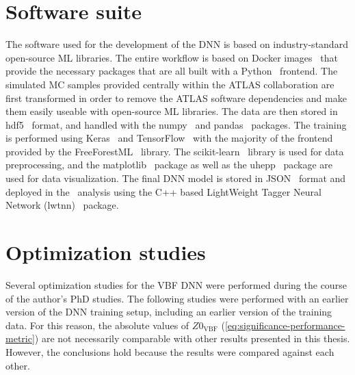 \section{Software suite}
\label{app:dnn:software-suite}
The software used for the development of the DNN is based on industry-standard open-source ML libraries.
The entire workflow is based on Docker images~\cite{merkel2014docker} that provide the necessary packages that are all built with a Python~\cite{10.5555/1593511} frontend. The simulated MC samples provided centrally within the ATLAS collaboration are first transformed in order to remove the ATLAS software dependencies and make them easily useable with open-source ML libraries. The data are then stored in hdf5~\cite{fortner1998hdf} format, and handled with the numpy~\cite{2020NumPy-Array} and pandas~\cite{mckinney2010data} packages. The training is performed using Keras~\cite{chollet2015keras} and TensorFlow~\cite{abadi2016tensorflow} with the majority of the frontend provided by the FreeForestML~\cite{FreeForestML} library.
The scikit-learn~\cite{pedregosa2011scikit} library is used for data preprocessing, and the matplotlib~\cite{hunter2007matplotlib} package as well as the uhepp~\cite{UheppFrank} package are used for data visualization. The final DNN model is stored in JSON~\cite{pezoa2016foundations} format and deployed in the \HWW\ analysis using the C++ based LightWeight Tagger Neural Network (lwtnn)~\cite{daniel_hay_guest_2019_3249317} package.

\section{Optimization studies}
\label{app:dnn:opt-studies}
Several optimization studies for the VBF DNN were performed during the course of the author's PhD studies.
The following studies were performed with an earlier version of the DNN training setup, including an earlier version of the training data. For this reason, the absolute values of $Z0_{\mathrm{VBF}}$ (\cref{eq:significance-performance-metric}) are not necessarily comparable with other results presented in this thesis. However, the conclusions hold because the results were compared against each other.

